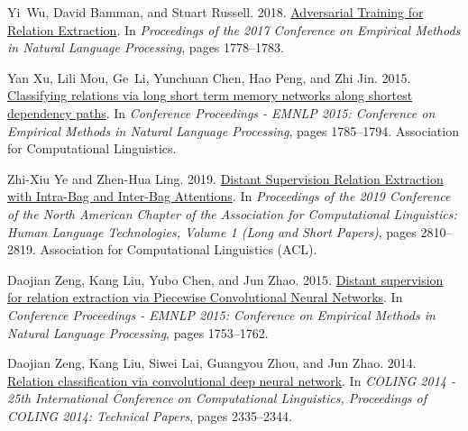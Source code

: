 \documentclass[11pt,a4paper]{article}
\begin{document}
\begin{thebibliography}{30}
Yi~Wu, David Bamman, and Stuart Russell. 2018.
\newblock \href {https://doi.org/10.18653/v1/d17-1187} {{Adversarial Training
  for Relation Extraction}}.
\newblock In \emph{Proceedings of the 2017 Conference on Empirical Methods in
  Natural Language Processing}, pages 1778--1783.

Yan Xu, Lili Mou, Ge~Li, Yunchuan Chen, Hao Peng, and Zhi Jin. 2015.
\newblock \href {https://doi.org/10.18653/v1/d15-1206} {{Classifying relations
  via long short term memory networks along shortest dependency paths}}.
\newblock In \emph{Conference Proceedings - EMNLP 2015: Conference on Empirical
  Methods in Natural Language Processing}, pages 1785--1794. Association for
  Computational Linguistics.

Zhi-Xiu Ye and Zhen-Hua Ling. 2019.
\newblock \href {https://doi.org/10.18653/v1/n19-1288} {{Distant Supervision
  Relation Extraction with Intra-Bag and Inter-Bag Attentions}}.
\newblock In \emph{Proceedings of the 2019 Conference of the North American
  Chapter of the Association for Computational Linguistics: Human Language
  Technologies, Volume 1 (Long and Short Papers)}, pages 2810--2819.
  Association for Computational Linguistics (ACL).

Daojian Zeng, Kang Liu, Yubo Chen, and Jun Zhao. 2015.
\newblock \href {https://www.aclweb.org/anthology/D15-1203} {{Distant
  supervision for relation extraction via Piecewise Convolutional Neural
  Networks}}.
\newblock In \emph{Conference Proceedings - EMNLP 2015: Conference on Empirical
  Methods in Natural Language Processing}, pages 1753--1762.

Daojian Zeng, Kang Liu, Siwei Lai, Guangyou Zhou, and Jun Zhao. 2014.
\newblock \href {http://en.wikipedia.org/wiki/Bag-of-words} {{Relation
  classification via convolutional deep neural network}}.
\newblock In \emph{COLING 2014 - 25th International Conference on Computational
  Linguistics, Proceedings of COLING 2014: Technical Papers}, pages 2335--2344.

\end{thebibliography}
 
\end{document}
